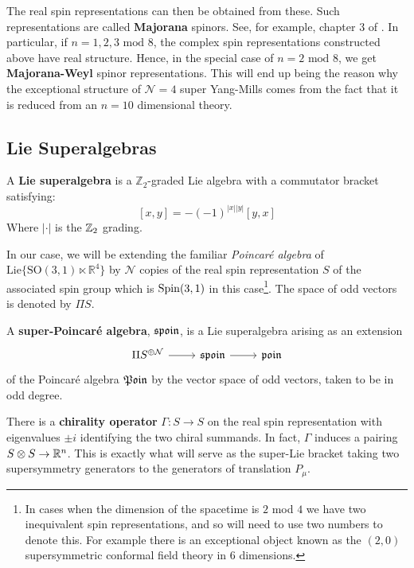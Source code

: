 		The real spin representations can then be obtained from these. Such representations are called \textbf{Majorana} spinors. See, for example, chapter 3 of \cite{meinrenken2013}. In particular, if $n = 1,2, 3 \text{ mod } 8$, the complex spin representations constructed above have real structure. Hence, in the special case of $n=2 \text{ mod } 8$, we get \textbf{Majorana-Weyl} spinor representations. This will end up being the reason why the exceptional structure of $\mathcal N=4$ super Yang-Mills comes from the fact that it is reduced from an $n=10$ dimensional theory.
		
		
		

	\subsection{Lie Superalgebras} %
	\label{sub:lie_superalgebras}

	\begin{defn}
	A \textbf{Lie superalgebra} is a $\mathbb Z_2$-graded Lie algebra with a commutator bracket satisfying:
		$$[x, y]= -(-1)^{|x||y|} [y, x]$$
	Where $|\cdot|$ is the $\mathbb{Z}_2$ grading.
	\end{defn}
	In our case, we will be extending the familiar \emph{Poincar\'e algebra} of $\mathrm{Lie}\{ \mathrm{SO}(3, 1) \ltimes \mathbb R^4  \}$ by $\mathcal N$ copies of the real spin representation $S$ of the associated spin group which is $\mathrm{Spin}(3,1)$ in this case\footnote{In cases when the dimension of the spacetime is $2$ mod $4$ we have two inequivalent spin representations, and so will need to use two numbers to denote this. For example there is an exceptional object known as the $(2,0)$ supersymmetric conformal field theory in 6 dimensions.}. The space of odd vectors is denoted by $\Pi S$.
	\begin{defn}
		A \textbf{super-Poincar\'e algebra}, $\frak{spoin}$, is a Lie superalgebra arising as an extension
		\[
			\begin{tikzcd}
				\Pi S^{\oplus \mathcal N} \arrow[r] & \frak{spoin} \arrow[r] & \frak{poin}
			\end{tikzcd}
		\]
		of the Poincar\'e algebra $\frak{Poin}$ by the vector space of odd vectors, taken to be in odd degree.
	\end{defn}
	
	There is a \textbf{chirality operator} $\Gamma: S \to S$ on the real spin representation with eigenvalues $\pm i$ identifying the two chiral summands. In fact, $\Gamma$ induces a pairing $S \otimes S \to \mathbb{R}^n$. This is exactly what will serve as the super-Lie bracket taking two supersymmetry generators to the generators of translation $P_\mu$.
	
